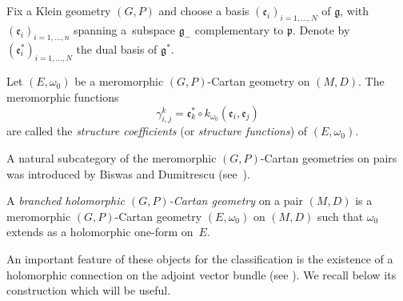 \documentclass[pdftex]{sigma}
\numberwithin{equation}{section}
\begin{document}
Fix a Klein geometry $(G,P)$ and choose a basis $(\mathfrak{e}_i)_{i=1,\dots,N}$ of $\mathfrak{g}$, with $(\mathfrak{e}_i)_{i=1,\dots,n}$ spanning a~subspace $\mathfrak{g}_-$ complementary to $\mathfrak{p}$. Denote by $(\mathfrak{e}_i^*)_{i=1,\dots,N}$ the dual basis of $\mathfrak{g}^*$.
\begin{Definition}\label{constantes}Let $(E,\omega_0)$ be a meromorphic $(G,P)$-Cartan geometry on $(M,D)$. The meromorphic functions
\[\gamma_{i,j}^k= \mathfrak{e}_k^* \circ k_{\omega_0}(\mathfrak{e}_i,\mathfrak{e}_j) \]
 are called the \textit{structure coefficients} (or \textit{structure functions}) of $(E,\omega_0)$. \end{Definition}

A natural subcategory of the meromorphic $(G,P)$-Cartan geometries on pairs was introduced by Biswas and Dumitrescu (see~\cite{BD}).

\begin{Definition}\label{branchedCartan} A \textit{branched holomorphic $(G,P)$-Cartan geometry} on a pair $(M,D)$ is a meromorphic $(G,P)$-Cartan geometry $(E,\omega_0)$ on $(M,D)$ such that $\omega_0$ extends as a holomorphic one-form on~$E$.
\end{Definition}

An important feature of these objects for the classification is the existence of a holomorphic connection on the adjoint vector bundle (see \cite[p.~7]{BD}). We recall below its construction which will be useful.
\end{document}
